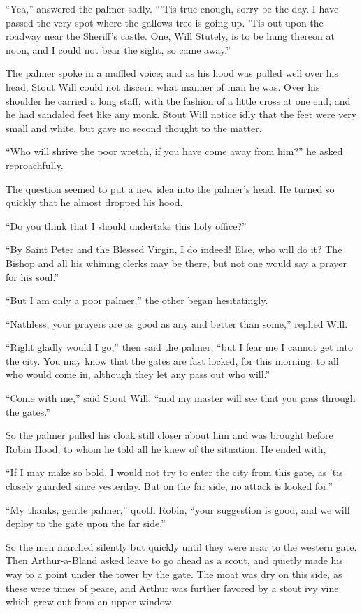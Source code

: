 ``Yea,'' answered the palmer sadly. ``'Tis true enough, sorry be the
day. I have passed the very spot where the gallows-tree is going up.
'Tis out upon the roadway near the Sheriff's castle. One, Will Stutely,
is to be hung thereon at noon, and I could not bear the sight, so came
away.''

The palmer spoke in a muffled voice; and as his hood was pulled well
over his head, Stout Will could not discern what manner of man he was.
Over his shoulder he carried a long staff, with the fashion of a little
cross at one end; and he had sandaled feet like any monk. Stout Will
notice idly that the feet were very small and white, but gave no second
thought to the matter.

``Who will shrive the poor wretch, if you have come away from him?'' he
asked reproachfully.

The question seemed to put a new idea into the palmer's head. He turned
so quickly that he almost dropped his hood.

``Do you think that I should undertake this holy office?''

``By Saint Peter and the Blessed Virgin, I do indeed! Else, who will do
it? The Bishop and all his whining clerks may be there, but not one
would say a prayer for his soul.''

``But I am only a poor palmer,'' the other began hesitatingly.

``Nathless, your prayers are as good as any and better than some,''
replied Will.

``Right gladly would I go,'' then said the palmer; ``but I fear me I
cannot get into the city. You may know that the gates are fast locked,
for this morning, to all who would come in, although they let any pass
out who will.''

``Come with me,'' said Stout Will, ``and my master will see that you
pass through the gates.''

So the palmer pulled his cloak still closer about him and was brought
before Robin Hood, to whom he told all he knew of the situation. He
ended with,

``If I may make so bold, I would not try to enter the city from this
gate, as 'tis closely guarded since yesterday. But on the far side, no
attack is looked for.''

``My thanks, gentle palmer,'' quoth Robin, ``your suggestion is good,
and we will deploy to the gate upon the far side.''

So the men marched silently but quickly until they were near to the
western gate. Then Arthur-a-Bland asked leave to go ahead as a scout,
and quietly made his way to a point under the tower by the gate. The
moat was dry on this side, as these were times of peace, and Arthur was
further favored by a stout ivy vine which grew out from an upper window.

